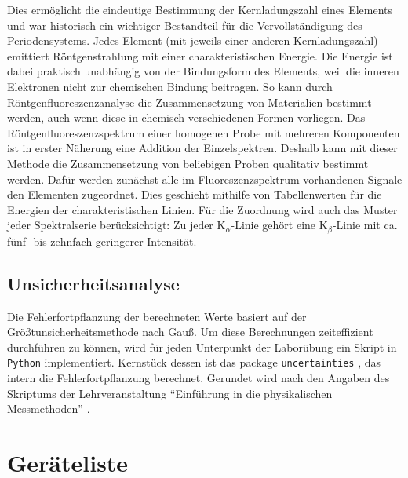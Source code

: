 \documentclass[ngerman]{scrartcl}
\begin{document}
Dies ermöglicht die eindeutige
Bestimmung der Kernladungszahl eines Elements und war historisch ein wichtiger Bestandteil für die
Vervollständigung des Periodensystems. Jedes Element (mit jeweils einer anderen Kernladungszahl)
emittiert Röntgenstrahlung mit einer charakteristischen Energie. Die Energie ist dabei praktisch
unabhängig von der Bindungsform des Elements, weil die inneren Elektronen nicht zur
chemischen Bindung beitragen. So kann durch Röntgenfluoreszenzanalyse die Zusammensetzung von
Materialien bestimmt werden, auch wenn diese in chemisch verschiedenen Formen vorliegen. Das
Röntgenfluoreszenzspektrum einer homogenen Probe mit mehreren Komponenten ist in erster
Näherung eine Addition der Einzelspektren. Deshalb kann mit dieser Methode die Zusammensetzung
von beliebigen Proben qualitativ bestimmt werden. Dafür werden zunächst alle im
Fluoreszenzspektrum vorhandenen Signale den Elementen zugeordnet. Dies geschieht mithilfe von
Tabellenwerten für die Energien der charakteristischen Linien. Für die Zuordnung wird auch das
Muster jeder Spektralserie berücksichtigt: Zu jeder K$_\alpha$-Linie gehört eine K$_\beta$-Linie mit ca. fünf- bis zehnfach
geringerer Intensität.


\subsection{Unsicherheitsanalyse}
\label{subsec:unsicherheitsanalyse}

Die Fehlerfortpflanzung der berechneten Werte basiert auf der Größtunsicherheitsmethode nach Gauß. Um diese Berechnungen zeiteffizient durchführen zu können, wird für jeden Unterpunkt der Laborübung ein Skript in \texttt{Python} implementiert. Kernstück dessen ist das package \texttt{uncertainties} \cite{ref:uncertainties}, das intern die Fehlerfortpflanzung berechnet. Gerundet wird nach den Angaben des Skriptums der Lehrveranstaltung \enquote{Einführung in die physikalischen Messmethoden} \cite{ref:messmethoden}.



\section{Geräteliste}
\label{sec:geraeteliste}
\end{document}
